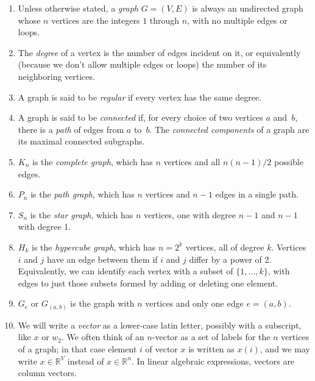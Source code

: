 \documentclass[11pt]{article}
\newcommand{\Real}{\mathbb{R}}          %
\begin{document}
\begin{enumerate}

\item
Unless otherwise stated, a {\em graph} $G = (V,E)$ is always 
an undirected graph whose $n$ vertices are the integers 
$1$ through $n$, with no multiple edges or loops.

\item
The {\em degree} of a vertex is the number of edges incident on it, 
or equivalently (because we don't allow multiple edges or loops)
the number of its neighboring vertices.

\item 
A graph is said to be {\em regular} if every vertex has the same degree.

\item
A graph is said to be {\em connected} if, for every choice of two
vertices $a$ and~$b$, there is a {\em path} of edges from $a$ to~$b$.
The {\em connected components} of a graph are its maximal connected
subgraphs.

\item
$K_n$ is the {\em complete graph}, which has $n$ vertices and all $n(n-1)/2$ possible edges.

\item
$P_n$ is the {\em path graph}, which has $n$ vertices and $n-1$ edges in a single path.

\item
$S_n$ is the {\em star graph}, which has $n$ vertices, one with degree $n-1$ and 
$n-1$ with degree 1.

\item
$H_k$ is the {\em hypercube graph}, which has $n=2^k$ vertices, all of degree $k$.
Vertices $i$ and $j$ have an edge between them if $i$ and $j$ differ by a power of 2.
Equivalently, we can identify each vertex with a subset of $\{1,\ldots,k\}$,
with edges to just those subsets formed by adding or deleting one element.

\item
$G_e$ or $G_{(a,b)}$ is the graph with $n$ vertices and only one edge $e = (a,b)$.

\item
We will write a {\em vector} as a lower-case latin letter, 
possibly with a subscript, like $x$ or $w_2$.  
We often think of an $n$-vector as a set of labels for the
$n$ vertices of a graph; 
in that case element $i$ of vector $x$ is written as $x(i)$,
and we may write $x\in\Real^V$ instead of $x\in\Real^n$.
In linear algebraic expressions, vectors are column vectors.


\end{enumerate}
\end{document}
